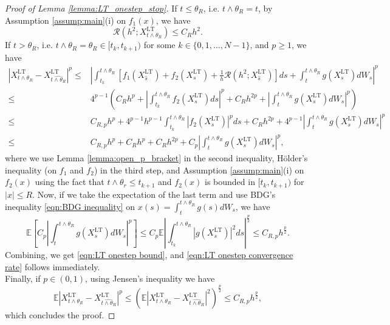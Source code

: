 \documentclass[10pt,a4paper]{amsart}
\begin{document}
\begin{proof}[Proof of Lemma \ref{lemma:LT_onestep_stop}]
If $t\leq \theta_R$, i.e. $t\wedge\theta_R=t$,  by Assumption \ref{assump:main}(i) on $f_1(x)$, we have
    \begin{equation*}
        \mathcal{R}(h^2;X^{\textrm{LT}}_{t\wedge \theta_R})\leq C_Rh^2.
    \end{equation*}
If $t>\theta_R$, i.e. $t\wedge \theta_R=\theta_R\in [t_k,t_{k+1})$ for some $k\in \{0,1,\dots,N-1\}$, and $p\geq1$, we have
    \begin{align*}
         \left|X^{\textrm{LT}}_{t \wedge \theta_R}-X^{\textrm{LT}}_{\widehat{t \wedge \theta_R}}\right|^p \leq &\left|\int_{t_k}^{t\wedge \theta_R} \left[f_1(X^{\textrm{LT}}_{\hat{s}})+f_2(X^{\textrm{LT}}_s)+\frac{1}{h}\mathcal{R}(h^2;X^{\textrm{LT}}_{\hat{s}})\right]ds+\int_{t}^{t\wedge \theta_R}g(X^{\textrm{LT}}_s)dW_s\right|^p\\
         \leq& 4^{p-1}\left(C_R h^p+\left|\int_{t_k}^{t\wedge \theta_R}f_2(X^{\textrm{LT}}_s)ds\right|^p+C_Rh^{2p}+\left|\int_{t}^{t\wedge \theta_R}g(X^{\textrm{LT}}_s)dW_s\right|^p\right)\\
         \leq&C_{R,p}h^p+4^{p-1}h^{p-1}\int_{t_k}^{t\wedge \theta_R}\left|f_2(X^{\textrm{LT}}_s)\right|^pds+C_Rh^{2p}+4^{p-1}\left|\int_{t}^{t\wedge \theta_R}g(X^{\textrm{LT}}_s)dW_s\right|^p\\
         \leq&C_{R,p}h^p+C_Rh^p+C_Rh^{2p}+C_p\left|\int_{t}^{t\wedge \theta_R}g(X^{\textrm{LT}}_s)dW_s\right|^p,
    \end{align*}
    where we use Lemma \ref{lemma:open_p_bracket} in the second inequality, H\"older's inequality (on $f_1$ and $f_2$) in the third step, and Assumption \ref{assump:main}(i) on $f_2(x)$ using the fact that $t\wedge\theta_r\leq t_{k+1}$ and $f_2(x)$ is bounded in $[t_k,t_{k+1})$ for $|x|\leq R$. Now, if we take the expectation of the last term and use BDG's inequality \eqref{eqn:BDG inequality} on $x(s)=\int_t^{t\wedge\theta_R}g(s)dW_s$, we have 
    \begin{equation*}
        \mathbb{E}\left[C_p\left|\int_{t}^{t\wedge \theta_R}g(X^{\textrm{LT}}_s)dW_s\right|^p\right]\leq C_p\mathbb{E}\left|\int_{t_k}^{t\wedge \theta_R}|g(X^{\textrm{LT}}_s)|^{ 2}ds\right|^{\frac{p}{2}}\leq C_{R,p}h^{\frac{p}{2}}.
    \end{equation*}
    Combining, we get \eqref{eqn:LT onestep bound}, and \eqref{eqn:LT onestep convergence rate} follows immediately.\\
    Finally, if $p\in (0,1)$, using Jensen's inequality we have
    \begin{equation}
        \mathbb{E}\left|X^{\textrm{LT}}_{t\wedge \theta_R}-X^{\textrm{LT}}_{\widehat{t\wedge \theta_R}}\right|^p\leq  \left(\mathbb{E}\left|X^{\textrm{LT}}_{t\wedge \theta_R}-X^{\textrm{LT}}_{\widehat{t\wedge \theta_R}}\right|^2\right)^{\frac{p}{2}}\leq C_{R,p}h^{\frac{p}{2}},
    \end{equation}
    which concludes the proof.
\end{proof}
\end{document}

